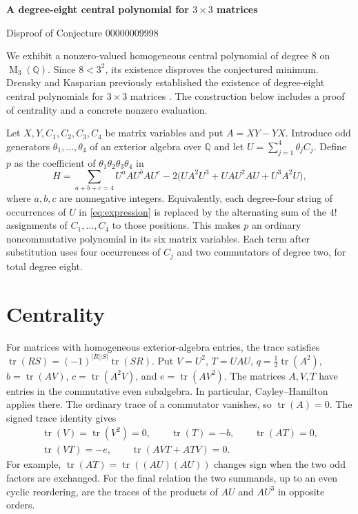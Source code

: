 \documentclass[11pt]{article}
\DeclareMathOperator{\tr}{tr}
\newcommand{\Mat}{\operatorname{M}_3}
\begin{document}
\begin{center}
  {\Large\bfseries A degree-eight central polynomial for \(3\times3\) matrices\par}
  \smallskip
  Disproof of Conjecture 00000009998
\end{center}

We exhibit a nonzero-valued homogeneous central polynomial of degree \(8\) on
\(\Mat(\mathbb Q)\). Since \(8<3^2\), its existence disproves the conjectured
minimum. Drensky and Kasparian previously established the existence of
degree-eight central polynomials for \(3\times 3\) matrices
\cite{drensky-kasparian}. The construction below includes a proof of centrality
and a concrete nonzero evaluation.

Let \(X,Y,C_1,C_2,C_3,C_4\) be matrix variables and put \(A=XY-YX\).
Introduce odd generators \(\theta_1,\ldots,\theta_4\) of an exterior algebra
over \(\mathbb Q\) and let \(U=\sum_{j=1}^4\theta_j C_j\). Define \(p\) as
the coefficient of \(\theta_1\theta_2\theta_3\theta_4\) in
\begin{equation}
\label{eq:expression}
 H=\sum_{a+b+c=4}U^a A U^b A U^c
       -2\bigl(UA^2U^3+UAU^2AU+U^3A^2U\bigr),
\end{equation}
where \(a,b,c\) are nonnegative integers. Equivalently, each degree-four
string of occurrences of \(U\) in \eqref{eq:expression} is replaced by the
alternating sum of the \(4!\) assignments of \(C_1,\ldots,C_4\) to those
positions. This makes \(p\) an ordinary noncommutative polynomial in its six
matrix variables. Each term after substitution uses four occurrences of
\(C_j\) and two commutators of degree two, for total degree eight.

\section*{Centrality}

For matrices with homogeneous exterior-algebra entries, the trace satisfies
\(\tr(RS)=(-1)^{\lvert R\rvert\lvert S\rvert}\tr(SR)\).
Put \(V=U^2\), \(T=UAU\), \(q=\tfrac12\tr(A^2)\),
\(b=\tr(AV)\), \(c=\tr(A^2V)\), and \(e=\tr(AV^2)\).
The matrices \(A,V,T\) have entries in the commutative even subalgebra. In
particular, Cayley--Hamilton applies there. The ordinary trace of a
commutator vanishes, so \(\tr(A)=0\). The signed trace identity gives
\[
 \begin{gathered}
   \tr(V)=\tr(V^2)=0,\qquad \tr(T)=-b,\qquad \tr(AT)=0,\\
   \tr(VT)=-e,\qquad \tr(AVT+ATV)=0.
 \end{gathered}
\]
For example, \(\tr(AT)=\tr((AU)(AU))\) changes sign when the two odd
factors are exchanged. For the final relation the two summands, up to an
even cyclic reordering, are the traces of the products of \(AU\) and
\(AU^3\) in opposite orders.
\end{document}
